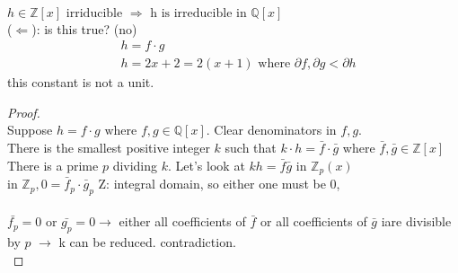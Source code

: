 \documentclass{article}
\begin{document}
\begin{lemma} \leavevmode \\ 
    $h\in \mathbb{Z}[x] \text{ irriducible } \Rightarrow \text{ h is irreducible in }\mathbb{Q}[x]$ \\ 
    ($\Leftarrow$): is this true? (no)\\
    \quad \begin{align*}
        &h = f \cdot g \\ 
        &h = 2x+ 2 = 2(x+1) \text{ where } \partial f, \partial g < \partial h
    \end{align*}
    this constant is not a unit. 
    \begin{proof}
        \leavevmode \\ 
        Suppose $h = f\cdot g\text{ where }f, g \in \mathbb{Q}[x]$.  Clear denominators in $f, g$. \\ 
        There is the smallest positive integer $k$ such that $k \cdot h = \bar{f}\cdot \bar{g}$ where $\bar{f}, \bar{g} \in \mathbb{Z}[x]$ \\ 
        There is a prime $p$ dividing $k$. Let's look at $kh = \bar{f} \bar{g}$ in $\mathbb{Z}_p(x)$\\ 
        \quad in $\mathbb{Z}_p, 0 = \bar{f}_p \cdot \bar{g}_p$ Z: integral domain, so either one must be 0, \\  \\ 
        $\bar{f_p} = 0 $ or $\bar{g_p} = 0 \rightarrow $ either all coefficients of $\bar{f}$ or all coefficients of $\bar{g}$ iare  divisible by $p$ $\rightarrow $ k can be reduced. contradiction. \\ 
    \end{proof}
\end{lemma}
\end{document}
